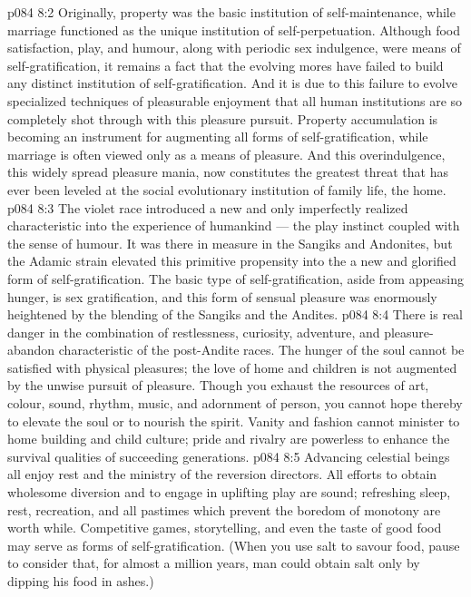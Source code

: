 \vs p084 8:2 Originally, property was the basic institution of self\hyp{}maintenance, while marriage functioned as the unique institution of self\hyp{}perpetuation. Although food satisfaction, play, and humour, along with periodic sex indulgence, were means of self\hyp{}gratification, it remains a fact that the evolving mores have failed to build any distinct institution of self\hyp{}gratification. And it is due to this failure to evolve specialized techniques of pleasurable enjoyment that all human institutions are so completely shot through with this pleasure pursuit. Property accumulation is becoming an instrument for augmenting all forms of self\hyp{}gratification, while marriage is often viewed only as a means of pleasure. And this overindulgence, this widely spread pleasure mania, now constitutes the greatest threat that has ever been leveled at the social evolutionary institution of family life, the home.
\vs p084 8:3 The violet race introduced a new and only imperfectly realized characteristic into the experience of humankind --- the play instinct coupled with the sense of humour. It was there in measure in the Sangiks and Andonites, but the Adamic strain elevated this primitive propensity into the  a new and glorified form of self\hyp{}gratification. The basic type of self\hyp{}gratification, aside from appeasing hunger, is sex gratification, and this form of sensual pleasure was enormously heightened by the blending of the Sangiks and the Andites.
\vs p084 8:4 There is real danger in the combination of restlessness, curiosity, adventure, and pleasure\hyp{}abandon characteristic of the post\hyp{}Andite races. The hunger of the soul cannot be satisfied with physical pleasures; the love of home and children is not augmented by the unwise pursuit of pleasure. Though you exhaust the resources of art, colour, sound, rhythm, music, and adornment of person, you cannot hope thereby to elevate the soul or to nourish the spirit. Vanity and fashion cannot minister to home building and child culture; pride and rivalry are powerless to enhance the survival qualities of succeeding generations.
\vs p084 8:5 Advancing celestial beings all enjoy rest and the ministry of the reversion directors. All efforts to obtain wholesome diversion and to engage in uplifting play are sound; refreshing sleep, rest, recreation, and all pastimes which prevent the boredom of monotony are worth while. Competitive games, storytelling, and even the taste of good food may serve as forms of self\hyp{}gratification. (When you use salt to savour food, pause to consider that, for almost a million years, man could obtain salt only by dipping his food in ashes.)
